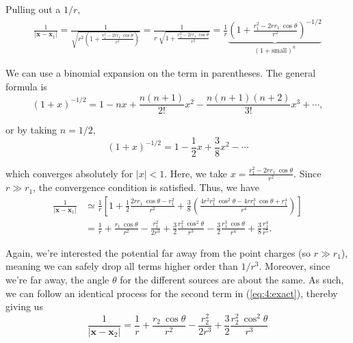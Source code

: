 \documentclass{article}
\numberwithin{equation}{section}
\begin{document}
Pulling out a $1/r$,
\begin{gather*}
    \frac{1}{\left| \bm{x} - \bm{x}_1 \right|} = \frac{1}{\sqrt{r^2 \left( 1 + \frac{r_1^2 - 2rr_1\ \cos{\theta}}{r^2} \right)}} = \frac{1}{r\ \sqrt{1 + \frac{r_1^2 - 2rr_1\ \cos{\theta}}{r^2}}} = \frac{1}{r} \underbrace{\left( 1 + \frac{r_1^2 - 2r r_1\ \cos{\theta}}{r^2} \right)^{-1/2}}_{\displaystyle \left( 1 + \text{small} \right)^n}
\end{gather*}

We can use a binomial expansion on the term in parentheses. The general formula is
\begin{equation*}
    \left( 1 + x \right)^{-1/2} = 1 - nx + \frac{n(n + 1)}{2!} x^2 - \frac{n(n+1)(n+2)}{3!}x^3 + \cdots,
\end{equation*}

or by taking $n = 1/2$,
\begin{equation*}
    \left( 1 + x \right)^{-1/2} = 1 - \frac{1}{2}x + \frac{3}{8}x^2 - \cdots
\end{equation*}

which converges absolutely for $|x| < 1$. Here, we take $\displaystyle x = \frac{r_1^2 - 2rr_1\ \cos{\theta}}{r^2}$. Since $r \gg r_1$, the convergence condition is satisfied. Thus, we have
\begin{align*}
    \frac{1}{\left| \bm{x} - \bm{x}_1 \right|} &\simeq \frac{1}{r} \left[ 1 + \frac{1}{2} \frac{2rr_1\ \cos{\theta} - r_1^2}{r^2} + \frac{3}{8} \left( \frac{4r^2 r_1^2\ \cos^2{\theta} - 4r r_1^3\ \cos{\theta} + r_1^4}{r^4} \right) \right] \\
    &= \frac{1}{r} + \frac{r_1\ \cos{\theta}}{r^2} - \frac{r_1^2}{2r^3} + \frac{3}{2} \frac{r_1^2\ \cos^2{\theta}}{r^3} - \frac{3}{2} \frac{r_1^3\ \cos{\theta}}{r^4} + \frac{3}{8} \frac{r_1^4}{r^5}.
\end{align*}

Again, we're interested the potential far away from the point charges (so $r \gg r_1$), meaning we can safely drop all terms higher order than $1/r^3$. Moreover, since we're far away, the angle $\theta$ for the different sources are about the same. As such, we can follow an identical process for the second term in (\ref{eq:4:exact}), thereby giving us
\begin{equation*}
    \frac{1}{\left| \bm{x} - \bm{x}_2 \right|} = \frac{1}{r} + \frac{r_2\ \cos{\theta}}{r^2} - \frac{r_2^2}{2r^3} + \frac{3}{2} \frac{r_2^2\ \cos^2{\theta}}{r^3}
\end{equation*}
\end{document}
